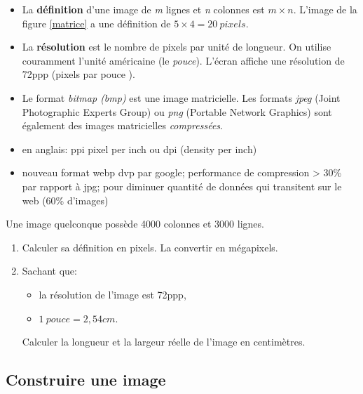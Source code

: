 \documentclass[a4paper,11pt]{article}
\begin{document}
\begin{Form}
\begin{center}
\label{matrice}
\end{center}
\begin{itemize}
\item La \textbf{définition} d'une image de \emph{m} lignes et \emph{n} colonnes est $m×n$. L'image de la figure \ref{matrice} a une définition de $5×4=20~pixels$.
\item La \textbf{résolution} est le nombre de pixels par unité de longueur. On utilise couramment l'unité américaine (le \emph{pouce}). L'écran affiche une résolution de 72ppp (pixels par pouce ).
\item Le format \emph{bitmap (bmp)} est une image matricielle. Les formats \emph{jpeg} (Joint Photographic Experts Group) ou \emph{png} (Portable Network Graphics) sont également des images matricielles \emph{compressées}.
\end{itemize}
\begin{commentprof}
\begin{itemize}
\item en anglais: ppi pixel per inch ou dpi (density per inch)
\item nouveau format webp dvp par google; performance de compression > 30\% par rapport à jpg; pour diminuer quantité de données qui transitent sur le web (60\% d'images)
\end{itemize}
\end{commentprof}
\begin{activite}
Une image quelconque possède 4000 colonnes et 3000 lignes.
\begin{enumerate}
\item Calculer sa définition en pixels. La convertir en mégapixels.
\item Sachant que:
\begin{itemize}
\item la résolution de l'image est 72ppp,
\item $1~pouce = 2,54cm$.
\end{itemize}
Calculer la longueur et la largeur réelle de l'image en centimètres.
\end{enumerate}
\end{activite}
\subsection{Construire une image}

\end{Form}
\end{document}
